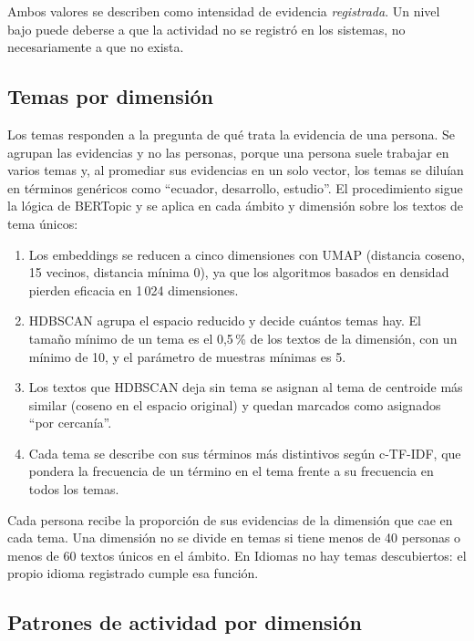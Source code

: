 Ambos valores se describen como intensidad de evidencia \textit{registrada}. Un nivel bajo puede deberse a que la actividad no se registró en los sistemas, no necesariamente a que no exista.

\subsection{Temas por dimensión}
\label{sec:met_temas}

Los temas responden a la pregunta de qué trata la evidencia de una persona. Se agrupan las evidencias y no las personas, porque una persona suele trabajar en varios temas y, al promediar sus evidencias en un solo vector, los temas se diluían en términos genéricos como ``ecuador, desarrollo, estudio''. El procedimiento sigue la lógica de BERTopic \parencite{Grootendorst2022} y se aplica en cada ámbito y dimensión sobre los textos de tema únicos:

\begin{enumerate}
    \item Los embeddings se reducen a cinco dimensiones con UMAP \parencite{McInnes2018} (distancia coseno, 15 vecinos, distancia mínima 0), ya que los algoritmos basados en densidad pierden eficacia en 1\,024 dimensiones.
    \item HDBSCAN \parencite{Campello2013} agrupa el espacio reducido y decide cuántos temas hay. El tamaño mínimo de un tema es el 0,5\,\% de los textos de la dimensión, con un mínimo de 10, y el parámetro de muestras mínimas es 5.
    \item Los textos que HDBSCAN deja sin tema se asignan al tema de centroide más similar (coseno en el espacio original) y quedan marcados como asignados ``por cercanía''.
    \item Cada tema se describe con sus términos más distintivos según c-TF-IDF, que pondera la frecuencia de un término en el tema frente a su frecuencia en todos los temas.
\end{enumerate}

Cada persona recibe la proporción de sus evidencias de la dimensión que cae en cada tema. Una dimensión no se divide en temas si tiene menos de 40 personas o menos de 60 textos únicos en el ámbito. En Idiomas no hay temas descubiertos: el propio idioma registrado cumple esa función.

\subsection{Patrones de actividad por dimensión}
\label{sec:met_patrones}

